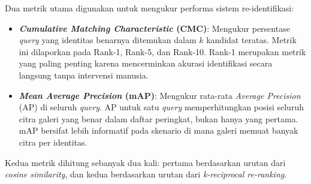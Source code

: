Dua metrik utama digunakan untuk mengukur performa sistem re-identifikasi:

\begin{itemize}
    \item \textbf{\textit{Cumulative Matching Characteristic} (CMC)}: Mengukur persentase \textit{query} yang identitas benarnya ditemukan dalam $k$ kandidat teratas. Metrik ini dilaporkan pada Rank-1, Rank-5, dan Rank-10. Rank-1 merupakan metrik yang paling penting karena mencerminkan akurasi identifikasi secara langsung tanpa intervensi manusia.
    \item \textbf{\textit{Mean Average Precision} (mAP)}: Mengukur rata-rata \textit{Average Precision} (AP) di seluruh \textit{query}. AP untuk satu \textit{query} memperhitungkan posisi seluruh citra galeri yang benar dalam daftar peringkat, bukan hanya yang pertama. mAP bersifat lebih informatif pada skenario di mana galeri memuat banyak citra per identitas.
\end{itemize}

Kedua metrik dihitung sebanyak dua kali: pertama berdasarkan urutan dari \textit{cosine similarity}, dan kedua berdasarkan urutan dari \textit{k-reciprocal re-ranking}.
